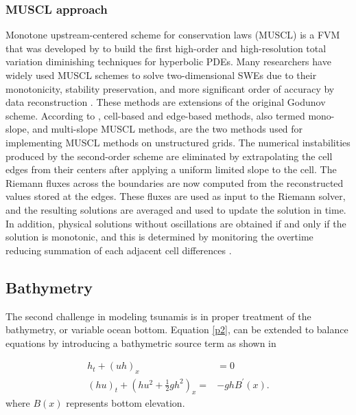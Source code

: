 \documentclass[10pt,a4paper]{article}
\begin{document}
	\subsubsection{MUSCL approach}
	
	Monotone upstream-centered scheme for conservation laws (MUSCL) is a FVM that was developed by \citet{van1979towards} to build the first high-order and high-resolution total variation diminishing techniques for hyperbolic PDEs. Many researchers have widely used MUSCL schemes to solve two-dimensional SWEs due to their monotonicity, stability preservation, and more significant order of accuracy by data reconstruction \citep{song2011robust,zhao2019improved,marche2007evaluation,liang2009adaptive}.  These methods are extensions of the original Godunov scheme.     According to  \citet{hou20132d}, cell-based and edge-based methods, also termed mono-slope, and multi-slope MUSCL methods, are the two methods used for implementing MUSCL methods on unstructured grids. The numerical instabilities produced by the second-order scheme are eliminated by extrapolating the cell edges from their centers after applying a uniform limited slope to the cell. The Riemann fluxes across the boundaries are now computed from the reconstructed values stored at the edges.  These fluxes are used as input to the Riemann solver, and the resulting solutions are averaged and used to update the solution in time.  In addition, physical solutions without oscillations are obtained if and only if the solution is monotonic, and this is determined by monitoring the overtime reducing summation of each adjacent cell differences \citep{hou2014multislope}.
	
	
	
	
	
	
	\subsection{Bathymetry}
	The second challenge in modeling tsunamis is in proper treatment of the bathymetry, or variable ocean bottom. 
	Equation \eqref{p2}, can be extended to balance equations by introducing a bathymetric source term as shown in 
	
	\begin{equation}
		\begin{aligned}
			h_{t} + (uh)_x &= 0 \\
			(hu)_t + \left(hu^{2} + \frac{1}{2}gh^{2} \right)_x =& -ghB^{\prime}(x).
			\label{bst}
		\end{aligned}
	\end{equation}	
	where $B(x)$ represents bottom elevation. 
	
\end{document}
